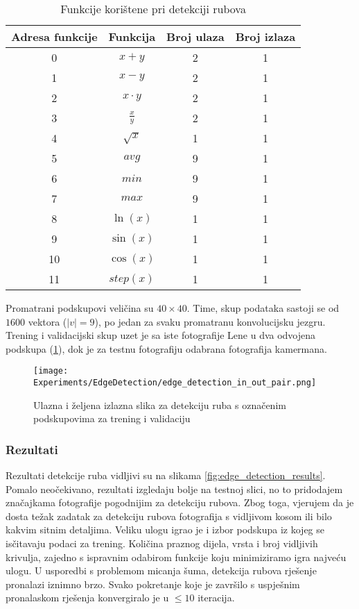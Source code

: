 \begin{table}
	\centering
	\begin{tabular}{||c c c c||}
		\hline
		Adresa funkcije & Funkcija & Broj ulaza & Broj izlaza\\ [0.5ex]
		\hline \hline
		0 & $x + y$ & 2 & 1\\
		1 & $x - y$ & 2 & 1\\
		2 & $x \cdot y$ & 2 & 1\\
		3 & $\frac{x}{y}$ & 2 & 1 \\
		4 & $\sqrt{x}$ & 1 & 1\\
		5 & $avg$ & 9 & 1\\
		6 & $min$ & 9 & 1\\
		7 & $max$ & 9 & 1\\
		8 & $\ln(x)$ & 1 & 1\\
		9 & $\sin(x)$ & 1 & 1\\
		10 & $\cos(x)$ & 1 & 1\\
		11 & $step(x)$ & 1 & 1\\ [1ex]
		\hline
	\end{tabular}
	\caption{Funkcije korištene pri detekciji rubova}
	\label{table:edge_detection_function_set}
\end{table}

Promatrani podskupovi veličina su $40 \times 40$.
Time, skup podataka sastoji se od $1600$ vektora ($|v| = 9$), po jedan za svaku promatranu konvolucijsku jezgru.
Trening i validacijski skup uzet je sa iste fotografije Lene u dva odvojena podskupa (\ref{fig:edge_detection_in_out_pair_example}), dok je za testnu fotografiju odabrana fotografija kamermana.

\begin{figure}
	\centering
	\texttt{[image: Experiments/EdgeDetection/edge\_detection\_in\_out\_pair.png]}
	\caption{Ulazna i željena izlazna slika za detekciju ruba s označenim podskupovima za trening i validaciju}
	\label{fig:edge_detection_in_out_pair_example}
\end{figure}

\subsubsection{Rezultati}
Rezultati detekcije ruba vidljivi su na slikama \ref{fig:edge_detection_results}. %
Pomalo neočekivano, rezultati izgledaju bolje na testnoj slici, no to pridodajem značajkama fotografije pogodnijim za detekciju rubova.
Zbog toga, vjerujem da je dosta težak zadatak za detekciju rubova fotografija s vidljivom kosom ili bilo kakvim sitnim detaljima.
Veliku ulogu igrao je i izbor podskupa iz kojeg se isčitavaju podaci za trening.
Količina praznog dijela, vrsta i broj vidljivih krivulja, zajedno s ispravnim odabirom funkcije koju minimiziramo igra najveću ulogu.
U usporedbi s problemom micanja šuma, detekcija rubova rješenje pronalazi iznimno brzo.
Svako pokretanje koje je završilo s uspješnim pronalaskom rješenja konvergiralo je u $\leq 10$ iteracija.

